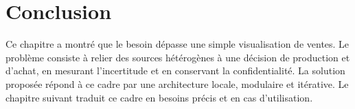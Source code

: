 \section{Conclusion}

Ce chapitre a montré que le besoin dépasse une simple visualisation de ventes.
Le problème consiste à relier des sources hétérogènes à une décision de production
et d'achat, en mesurant l'incertitude et en conservant la confidentialité. La
solution proposée répond à ce cadre par une architecture locale, modulaire et
itérative. Le chapitre suivant traduit ce cadre en besoins précis et en cas
d'utilisation.

